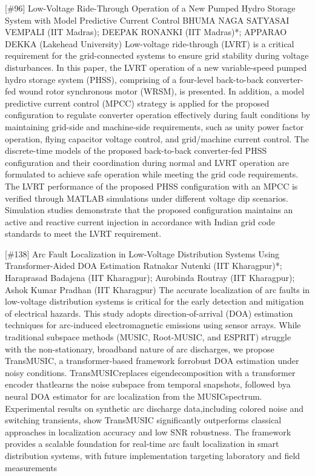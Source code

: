 {} \begin{abstract_online} {[\#96] Low-Voltage Ride-Through Operation of a New Pumped Hydro Storage System with Model Predictive Current Control} {} {BHUMA NAGA SATYASAI VEMPALI (IIT Madras); DEEPAK RONANKI (IIT Madras)*; APPARAO DEKKA (Lakehead University)} {} Low-voltage ride-through (LVRT) is a critical requirement for the grid-connected systems to ensure grid stability during voltage disturbances. In this paper, the LVRT operation of a new variable-speed pumped hydro storage system (PHSS), comprising of a four-level back-to-back converter-fed wound rotor synchronous motor (WRSM), is presented. In addition, a model predictive current control (MPCC) strategy is applied for the proposed configuration to regulate converter operation effectively during fault conditions by maintaining grid-side and machine-side requirements, such as unity power factor operation, flying capacitor voltage control, and grid/machine current control. The discrete-time models of the proposed back-to-back converter-fed PHSS configuration and their coordination during normal and LVRT operation are formulated to achieve safe operation while meeting the grid code requirements. The LVRT performance of the proposed PHSS configuration with an MPCC is verified through MATLAB simulations under different voltage dip scenarios. Simulation studies demonstrate that the proposed configuration maintains an active and reactive current injection in accordance with Indian grid code standards to meet the LVRT requirement. \end{abstract_online} 
{} \begin{abstract_online} {[\#138] Arc Fault Localization in Low-Voltage Distribution Systems Using Transformer-Aided DOA Estimation} {} {Ratnakar Nutenki (IIT Kharagpur)*; Haraprasad  Badajena (IIT Kharagpur); Aurobinda Routray (IIT Kharagpur); Ashok Kumar Pradhan (IIT Kharagpur)} {} The accurate localization of arc faults in low-voltage distribution systems is critical for the early detection and mitigation of electrical hazards. This study adopts direction-of-arrival (DOA) estimation techniques for arc-induced electromagnetic emissions using sensor arrays. While traditional subspace methods (MUSIC, Root-MUSIC, and ESPRIT) struggle with the non-stationary, broadband nature of arc discharges, we propose TransMUSIC, a transformer-based framework forrobust DOA estimation under noisy conditions. TransMUSICreplaces eigendecomposition with a transformer encoder thatlearns the noise subspace from temporal snapshots, followed bya neural DOA estimator for arc localization from the MUSICspectrum. Experimental results on synthetic arc discharge data,including colored noise and switching transients, show TransMUSIC significantly outperforms classical approaches in localization accuracy and low SNR robustness. The framework provides a scalable foundation for real-time arc fault localization in smart distribution systems, with future implementation targeting laboratory and field measurements \end{abstract_online} 
